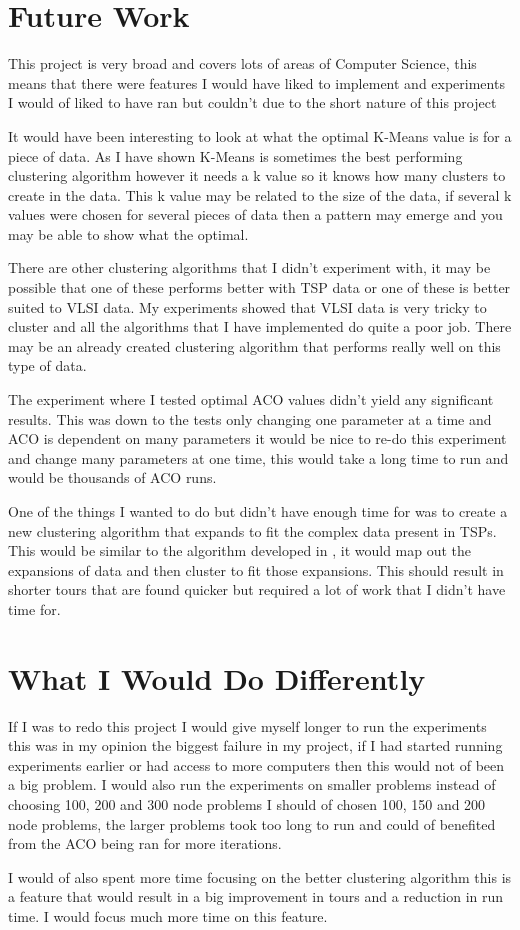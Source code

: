 \section{Future Work}

This project is very broad and covers lots of areas of Computer Science, this means that there were features I would have liked to implement and experiments I would of liked to have ran but couldn't due to the short nature of this project

It would have been interesting to look at what the optimal K-Means value is for a piece of data. As I have shown K-Means is sometimes the best performing clustering algorithm however it needs a k value so it knows how many clusters to create in the data. This k value may be related to the size of the data, if several k values were chosen for several pieces of data then a pattern may emerge and you may be able to show what the optimal.

There are other clustering algorithms that I didn't experiment with, it may be possible that one of these performs better with TSP data or one of these is better suited to VLSI data. My experiments showed that VLSI data is very tricky to cluster and all the algorithms that I have implemented do quite a poor job. There may be an already created clustering algorithm that performs really well on this type of data.

The experiment where I tested optimal ACO values didn't yield any significant results. This was down to the tests only changing one parameter at a time and ACO is dependent on many parameters it would be nice to re-do this experiment and change many parameters at one time, this would take a long time to run and would be thousands of ACO runs.

One of the things I wanted to do but didn't have enough time for was to create a new clustering algorithm that expands to fit the complex data present in TSPs. This would be similar to the algorithm developed in \cite{pang_chao-yang_ben-qiong_zhang_jie_wei_shan_zheng-chao_2014}, it would map out the expansions of data and then cluster to fit those expansions. This should result in shorter tours that are found quicker but required a lot of work that I didn't have time for.

\section{What I Would Do Differently}

If I was to redo this project I would give myself longer to run the experiments this was in my opinion the biggest failure in my project, if I had started running experiments earlier or had access to more computers then this would not of been a big problem. I would also run the experiments on smaller problems instead of choosing 100, 200 and 300 node problems I should of chosen 100, 150 and 200 node problems, the larger problems took too long to run and could of benefited from the ACO being ran for more iterations.

I would of also spent more time focusing on the better clustering algorithm this is a feature that would result in a big improvement in tours and a reduction in run time. I would focus much more time on this feature.
